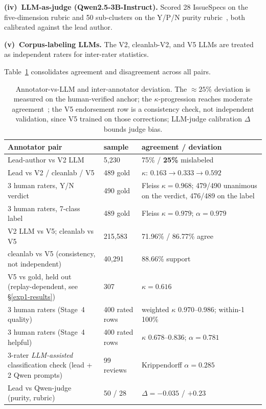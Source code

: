 \documentclass[preprint,12pt]{elsarticle}
\begin{document}
\textbf{(iv)~LLM-as-judge (Qwen2.5-3B-Instruct).} Scored 28 IssueSpecs on the five-dimension rubric and 50 sub-clusters on the Y/P/N purity rubric~\cite{zheng2023judging}, both calibrated against the lead author.

\textbf{(v)~Corpus-labeling LLMs.} The V2, cleanlab-V2, and V5 LLMs are treated as independent raters for inter-rater statistics.

Table~\ref{tab:annot-deviation} consolidates agreement and disagreement across all pairs.

\begin{table}[!htbp]\centering\footnotesize
  \caption{Annotator-vs-LLM and inter-annotator deviation. The $\approx 25\%$ deviation is
  measured on the human-verified anchor; the $\kappa$-progression reaches moderate
  agreement~\cite{landis1977measurement}; the V5 endorsement row is a consistency check, not independent validation, since V5 trained on those corrections;
  LLM-judge calibration $\Delta$ bounds judge bias.}\label{tab:annot-deviation}
  \begin{tabular}{@{}p{4.0cm}p{1.5cm}p{2.5cm}@{}}\toprule
  Annotator pair & sample & agreement / deviation \\\midrule
  Lead-author vs V2 LLM & 5{,}230 & 75\% / \textbf{25\%} mislabeled \\
  Lead vs V2 / cleanlab / V5 & 489 gold & $\kappa$: $0.163 \to 0.333 \to \mathbf{0.592}$ \\
  3 human raters, Y/N verdict & 490 gold & Fleiss $\kappa = \mathbf{0.968}$; 479/490 unanimous on the verdict, 476/489 on the label \\
  3 human raters, 7-class label & 489 gold & Fleiss $\kappa = \mathbf{0.979}$; $\alpha = 0.979$ \\
  V2 LLM vs V5; cleanlab vs V5 & 215{,}583 & 71.96\% / 86.77\% agree \\
  cleanlab vs V5 (consistency, not independent) & 40{,}291 & 88.66\% support \\
  V5 vs gold, held out (replay-dependent, see \S\ref{exp1-results}) & 307 & $\kappa = \mathbf{0.616}$ \\
  3 human raters (Stage~4 quality) & 400 rated rows & weighted $\kappa$ 0.970--0.986; within-1 100\% \\
  3 human raters (Stage~4 helpful) & 400 rated rows & $\kappa$ 0.678--0.836; $\alpha = 0.781$ \\
  3-rater \emph{LLM-assisted} classification check (lead + 2 Qwen prompts) & 99 reviews & Krippendorff $\alpha = 0.285$ \\
  Lead vs Qwen-judge (purity, rubric) & 50 / 28 & $\Delta = -0.035$ / $+0.23$ \\
  \bottomrule\end{tabular}\end{table}
\end{document}
